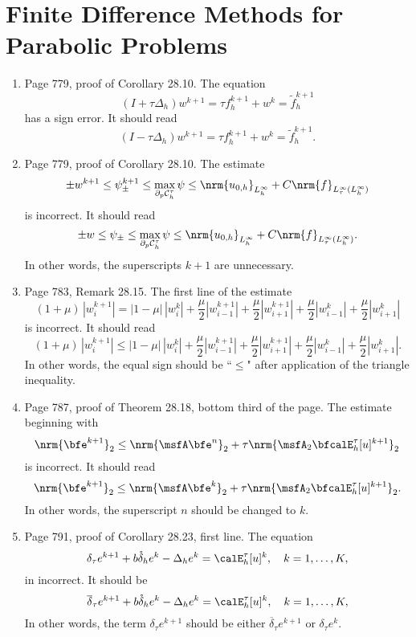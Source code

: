 \documentclass{book}
\begin{document}
	
	\setcounter{chapter}{27}
	
\chapter{Finite Difference Methods for Parabolic Problems}
	
	\begin{enumerate}
	\item
Page 779, proof of Corollary 28.10. The equation 
	\[
(I+\tau\Delta_h) w^{k+1} = \tau f_h^{k+1} + w^k = \tilde{f}_h^{k+1}
	\]
has a sign error. It should read
	\[
(I-\tau\Delta_h) w^{k+1} = \tau f_h^{k+1} + w^k = \tilde{f}_h^{k+1}.
	\]
	
	\item
Page 779, proof of Corollary 28.10. The estimate
	\[
\pm w^{k+1} \le \psi_{\pm}^{k+1} \le \max_{\partial_p \mathcal{C}_h^\tau} \psi \le \nrm{u_{0,h}}_{L_h^\infty} + C\nrm{f}_{L_\tau^\infty(L_h^\infty)}
	\]	
is incorrect. It should read 
	\[
\pm w \le \psi_{\pm} \le \max_{\partial_p \mathcal{C}_h^\tau} \psi \le \nrm{u_{0,h}}_{L_h^\infty} + C\nrm{f}_{L_\tau^\infty(L_h^\infty)}.
	\]	
In other words, the superscripts ${k+1}$ are unnecessary.

	\item
Page 783, Remark 28.15. The first line of the estimate 
	\[
(1+\mu) \, |w_i^{k+1}| = |1-\mu| \, |w_i^k| + \frac{\mu}{2} | w_{i-1}^{k+1}| + \frac{\mu}{2} |w_{i+1}^{k+1}| + \frac{\mu}{2} | w_{i-1}^k| + \frac{\mu}{2} |w_{i+1}^k| 	
	\]
is incorrect. It should read 
	\[
(1+\mu) \, |w_i^{k+1}| \le  |1-\mu| \, |w_i^k| + \frac{\mu}{2} | w_{i-1}^{k+1}| + \frac{\mu}{2} |w_{i+1}^{k+1}| + \frac{\mu}{2} | w_{i-1}^k| + \frac{\mu}{2} |w_{i+1}^k| 	.
	\]
In other words, the equal sign should be ``$\le$" after application of the triangle inequality.


	\item
Page 787, proof of Theorem 28.18, bottom third of the page. The estimate beginning with 
	\[
\nrm{\bfe^{k+1}}_2 \le \nrm{\msfA\bfe^n}_2 +\tau \nrm{\msfA_2\bfcalE_h^\tau[u]^{k+1}}_2
	\]
is incorrect. It should read
	\[
\nrm{\bfe^{k+1}}_2 \le \nrm{\msfA\bfe^k}_2 +\tau \nrm{\msfA_2\bfcalE_h^\tau[u]^{k+1}}_2.
	\]
In other words, the superscript $n$ should be changed to $k$.

	\item
Page 791, proof of Corollary 28.23, first line. The equation
	\[
\delta_\tau e^{k+1} + b \mathring\delta_h e^k - \Delta_h e^k = \calE_h^\tau[u]^k, \quad k = 1, \ldots, K,
	\]
in incorrect. It should be
	\[
\overline{\delta}_\tau e^{k+1} + b \mathring\delta_h e^k - \Delta_h e^k = \calE_h^\tau[u]^k, \quad k = 1, \ldots, K,
	\]
In other words, the term $\delta_\tau e^{k+1}$ should be either $\overline\delta_\tau e^{k+1}$ or $\delta_\tau e^k$.
	
	\end{enumerate}
	
\end{document}
